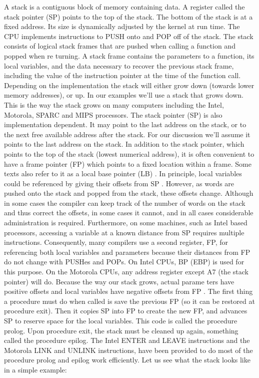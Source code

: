 \documentclass[10pt]{article}
\begin{document}
\begin{CJK}{UTF8}{bsmi}
A stack is a contiguous block of memory containing data. A register called the stack pointer (SP) points to the 
top of the stack. The bottom of the stack is at a fixed address. Its size is dynamically adjusted by the kernel at 
run time. The CPU implements instructions to PUSH onto and POP off of the stack. The stack consists of 
logical stack frames  that are pushed when calling a function and popped when re turning. A stack frame 
contains the parameters to a function, its local variables, and the data necessary to recover the previous stack frame,
including the value of the instruction pointer at the time of the function call. Depending on the 
implementation the stack will either grow down (towards lower memory addresses), or up. In our examples 
we'll use a stack that grows down. This is the way the stack grows on many computers including the Intel, 
Motorola, SPARC and MIPS processors. The  stack pointer (SP) is also implementation dependent.  It may point 
to the last address on the stack, or to the next free available address after the stack. For our discussion we'll 
assume it points to the last address on the stack. In addition to the stack pointer, which points to the top of the 
stack (lowest numerical address), it is often convenient to have a frame pointer (FP) which points to a fixed 
location within a frame. Some texts also refer to it as a local base pointer (LB) . In principle, local variables 
could be referenced by giving their offsets from SP . However, as words are pushed onto the stack and popped 
from the stack, these offsets change. Although in some cases the compiler can keep track of the number of 
words on the stack and thus correct the offsets, in some cases it cannot, and in all cases  considerable 
administration is required. Furthermore, on some machines, such as Intel based processors, accessing a variable 
at a known distance from SP requires multiple instructions. Consequently, many compilers use a second 
register, FP, for referencing both local variables and parameters because their distances from FP do not change 
with PUSHes and POPs. On Intel CPUs, BP (EBP) is used for this purpose. On the Motorola CPUs, any 
address register except A7 (the stack pointer) will do. Because the way our stack grows, actual parame ters have 
positive offsets and local variables have negative offsets from FP . The first thing a procedure must do when 
called is save the previous FP (so it can be restored at procedure exit). Then it copies SP into FP to create the 
new FP, and advances SP to reserve space for the local variables. This code is called  the procedure prolog. 
Upon procedure exit, the stack must be cleaned up again, something called  the procedure epilog. The Intel  
ENTER and LEAVE instructions and the Motorola LINK and UNLINK  instructions, have been provided to do 
most of the procedure prolog and epilog work efficiently. Let us see what the stack looks like in a simple 
example:


\end{CJK}
\end{document}
